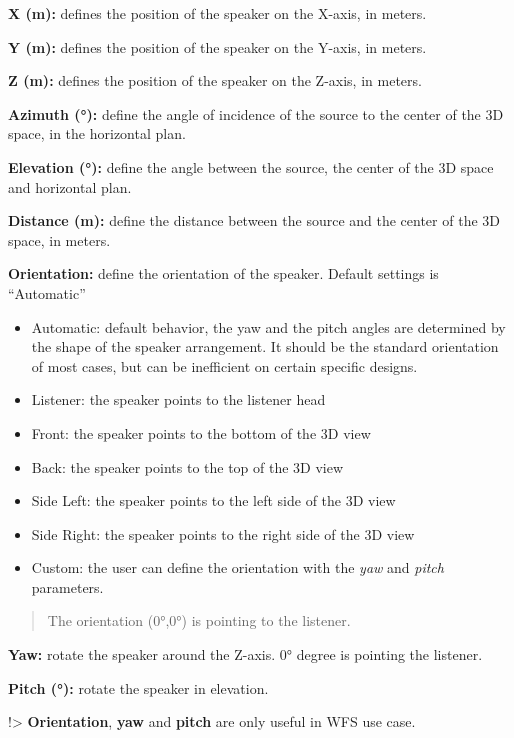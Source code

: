 \documentclass[
  letterpaper,
  DIV=11,
  numbers=noendperiod]{scrreport}
\providecommand{\tightlist}{%
  \setlength{\itemsep}{0pt}\setlength{\parskip}{0pt}}\usepackage{longtable,booktabs,array}
\begin{document}
\textbf{X (m):} defines the position of the speaker on the X-axis, in
meters.

\textbf{Y (m):} defines the position of the speaker on the Y-axis, in
meters.

\textbf{Z (m):} defines the position of the speaker on the Z-axis, in
meters.

\textbf{Azimuth (°):} define the angle of incidence of the source to the
center of the 3D space, in the horizontal plan.

\textbf{Elevation (°):} define the angle between the source, the center
of the 3D space and horizontal plan.

\textbf{Distance (m):} define the distance between the source and the
center of the 3D space, in meters.

\textbf{Orientation:} define the orientation of the speaker. Default
settings is ``Automatic''

\begin{itemize}
\tightlist
\item
  Automatic: default behavior, the yaw and the pitch angles are
  determined by the shape of the speaker arrangement. It should be the
  standard orientation of most cases, but can be inefficient on certain
  specific designs.
\item
  Listener: the speaker points to the listener head
\item
  Front: the speaker points to the bottom of the 3D view
\item
  Back: the speaker points to the top of the 3D view
\item
  Side Left: the speaker points to the left side of the 3D view
\item
  Side Right: the speaker points to the right side of the 3D view
\item
  Custom: the user can define the orientation with the \emph{yaw} and
  \emph{pitch} parameters.
\end{itemize}

\begin{quote}
The orientation (0°,0°) is pointing to the listener.
\end{quote}

\textbf{Yaw:} rotate the speaker around the Z-axis. 0° degree is
pointing the listener.

\textbf{Pitch (°):} rotate the speaker in elevation.

!\textgreater{} \textbf{Orientation}, \textbf{yaw} and \textbf{pitch}
are only useful in WFS use case.
\end{document}
